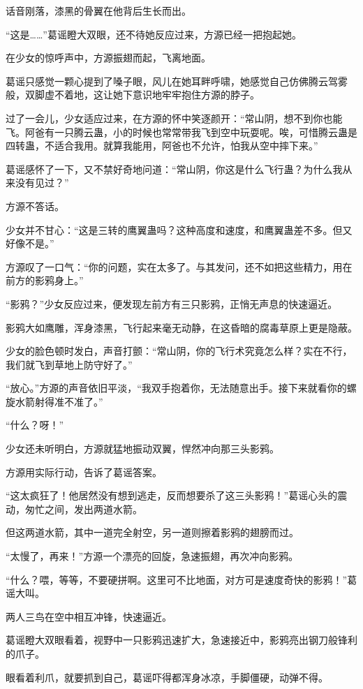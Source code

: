 \begin{this_body}
话音刚落，漆黑的骨翼在他背后生长而出。

“这是……”葛谣瞪大双眼，还不待她反应过来，方源已经一把抱起她。

在少女的惊呼声中，方源振翅而起，飞离地面。

葛谣只感觉一颗心提到了嗓子眼，风儿在她耳畔呼啸，她感觉自己仿佛腾云驾雾般，双脚虚不着地，这让她下意识地牢牢抱住方源的脖子。

过了一会儿，少女适应过来，在方源的怀中笑逐颜开：“常山阴，想不到你也能飞。阿爸有一只腾云蛊，小的时候也常常带我飞到空中玩耍呢。唉，可惜腾云蛊是四转蛊，不适合我用。就算我能用，阿爸也不允许，怕我从空中摔下来。”

葛谣感怀了一下，又不禁好奇地问道：“常山阴，你这是什么飞行蛊？为什么我从来没有见过？”

方源不答话。

少女并不甘心：“这是三转的鹰翼蛊吗？这种高度和速度，和鹰翼蛊差不多。但又好像不是。”

方源叹了一口气：“你的问题，实在太多了。与其发问，还不如把这些精力，用在前方的影鸦身上。”

“影鸦？”少女反应过来，便发现左前方有三只影鸦，正悄无声息的快速逼近。

影鸦大如鹰雕，浑身漆黑，飞行起来毫无动静，在这昏暗的腐毒草原上更是隐蔽。

少女的脸色顿时发白，声音打颤：“常山阴，你的飞行术究竟怎么样？实在不行，我们就飞到草地上防守好了。”

“放心。”方源的声音依旧平淡，“我双手抱着你，无法随意出手。接下来就看你的螺旋水箭射得准不准了。”

“什么？呀！”

少女还未听明白，方源就猛地振动双翼，悍然冲向那三头影鸦。

方源用实际行动，告诉了葛谣答案。

“这太疯狂了！他居然没有想到逃走，反而想要杀了这三头影鸦！”葛谣心头的震动，匆忙之间，发出两道水箭。

但这两道水箭，其中一道完全射空，另一道则擦着影鸦的翅膀而过。

“太慢了，再来！”方源一个漂亮的回旋，急速振翅，再次冲向影鸦。

“什么？喂，等等，不要硬拼啊。这里可不比地面，对方可是速度奇快的影鸦！”葛谣大叫。

两人三鸟在空中相互冲锋，快速逼近。

葛谣瞪大双眼看着，视野中一只影鸦迅速扩大，急速接近中，影鸦亮出钢刀般锋利的爪子。

眼看着利爪，就要抓到自己，葛谣吓得都浑身冰凉，手脚僵硬，动弹不得。


\end{this_body}
